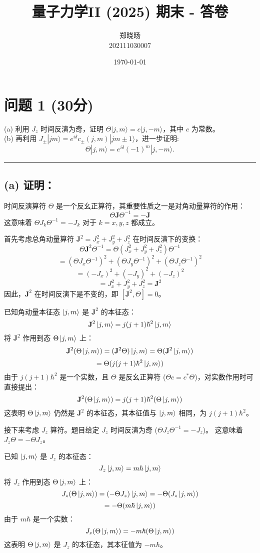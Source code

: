 \documentclass{article}
\begin{document}
\title{量子力学II (2025) 期末 - 答卷}
\author{郑晓旸 \\ 202111030007}
\date{\today}
\maketitle

\section*{问题 1 (30分)}
\noindent (a) 利用 \(J_z\) 时间反演为奇，证明 \(\Theta|j, m\rangle = c|j, -m\rangle\)，其中 \(c\) 为常数。\\
\noindent (b) 再利用 \(J_\pm |jm\rangle = e^{i\delta} c_\pm(j, m) |jm \pm 1\rangle\)，进一步证明:
\[ \Theta|j, m\rangle = e^{i\delta} (-1)^m |j, -m\rangle. \]
\rule[1ex]{\textwidth}{0.4pt}
\subsection*{(a) 证明：}
时间反演算符 \(\Theta\) 是一个反幺正算符，其重要性质之一是对角动量算符的作用：
\[ \Theta \mathbf{J} \Theta^{-1} = -\mathbf{J} \]
这意味着 \(\Theta J_k \Theta^{-1} = -J_k\) 对于 \(k=x, y, z\) 都成立。

首先考虑总角动量算符 \(\mathbf{J}^2 = J_x^2 + J_y^2 + J_z^2\) 在时间反演下的变换：
\[ \Theta \mathbf{J}^2 \Theta^{-1} = \Theta (J_x^2 + J_y^2 + J_z^2) \Theta^{-1} \]
\[ = (\Theta J_x \Theta^{-1})^2 + (\Theta J_y \Theta^{-1})^2 + (\Theta J_z \Theta^{-1})^2 \]
\[ = (-J_x)^2 + (-J_y)^2 + (-J_z)^2 \]
\[ = J_x^2 + J_y^2 + J_z^2 = \mathbf{J}^2 \]
因此，\(\mathbf{J}^2\) 在时间反演下是不变的，即 \([\mathbf{J}^2, \Theta] = 0\)。

已知角动量本征态 \(\ket{j, m}\) 是 \(\mathbf{J}^2\) 的本征态：
\[ \mathbf{J}^2 \ket{j, m} = j(j+1)\hbar^2 \ket{j, m} \]
将 \(\mathbf{J}^2\) 作用到态 \(\Theta\ket{j, m}\) 上：
\[ \mathbf{J}^2 (\Theta\ket{j, m}) = (\mathbf{J}^2 \Theta) \ket{j, m} = \Theta (\mathbf{J}^2 \ket{j, m}) \]
\[ = \Theta (j(j+1)\hbar^2 \ket{j, m}) \]
由于 \(j(j+1)\hbar^2\) 是一个实数，且 \(\Theta\) 是反幺正算符 (\(\Theta c = c^* \Theta\))，对实数作用时可直接提出：
\[ \mathbf{J}^2 (\Theta\ket{j, m}) = j(j+1)\hbar^2 (\Theta\ket{j, m}) \]
这表明 \(\Theta\ket{j, m}\) 仍然是 \(\mathbf{J}^2\) 的本征态，其本征值与 \(\ket{j, m}\) 相同，为 \(j(j+1)\hbar^2\)。

接下来考虑 \(J_z\) 算符。题目给定 \(J_z\) 时间反演为奇 (\(\Theta J_z \Theta^{-1} = -J_z\))。
这意味着 \(J_z \Theta = -\Theta J_z\)。

已知 \(\ket{j, m}\) 是 \(J_z\) 的本征态：
\[ J_z \ket{j, m} = m\hbar \ket{j, m} \]
将 \(J_z\) 作用到态 \(\Theta\ket{j, m}\) 上：
\[ J_z (\Theta\ket{j, m}) = (-\Theta J_z) \ket{j, m} = -\Theta (J_z \ket{j, m}) \]
\[ = -\Theta (m\hbar \ket{j, m}) \]
由于 \(m\hbar\) 是一个实数：
\[ J_z (\Theta\ket{j, m}) = -m\hbar (\Theta\ket{j, m}) \]
这表明 \(\Theta\ket{j, m}\) 是 \(J_z\) 的本征态，其本征值为 \(-m\hbar\)。
\end{document}
